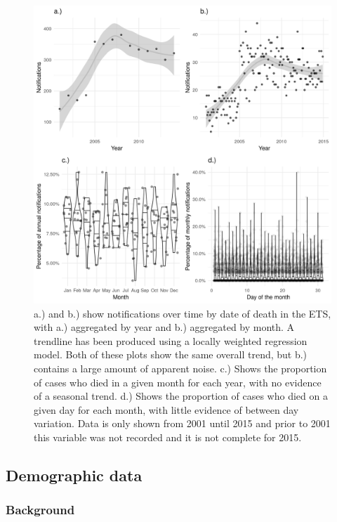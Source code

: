 \documentclass[11pt,twoside]{bristolthesis}
\begin{document}
  \begin{figure}
  
  {\centering \includegraphics[width=0.8\linewidth,]{chapters/tb-epi-england/figures/plot-detection-dateofdeath} 
  
  }
  
  \caption[a.) and b.) show notifications over time by date of death in the ETS, with a.) aggregated by year and  b.) aggregated by month.]{a.) and b.) show notifications over time by date of death in the ETS, with a.) aggregated by year and  b.) aggregated by month. A trendline has been produced using a locally weighted regression model. Both of these plots show the same overall trend, but b.) contains a large amount of apparent noise. c.) Shows the proportion of cases who died in a given month for each year, with no evidence of a seasonal trend. d.) Shows the proportion of cases who died on a given day for each month, with little evidence of between day variation. Data is only shown from 2001 until 2015 and prior to 2001 this variable was not recorded and it is not complete for 2015.}\label{fig:plot-detection-dateofdeath}
  \end{figure}
  \hypertarget{demographic-data}{%
  \subsection{Demographic data}\label{demographic-data}}
  
  \hypertarget{background-2}{%
  \subsubsection{Background}\label{background-2}}
  
\end{document}
